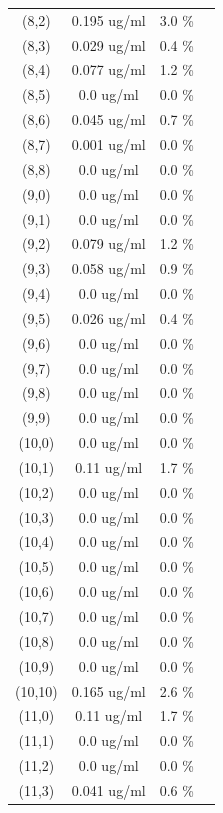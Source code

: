 \documentclass{article}
\begin{document}
\begin{tabular}{c c c c}
(8,2)&        0.195 ug/ml        &3.0 \%\\
(8,3)&        0.029 ug/ml        &0.4 \%\\
(8,4)&        0.077 ug/ml        &1.2 \%\\
(8,5)&        0.0 ug/ml        &0.0 \%\\
(8,6)&        0.045 ug/ml        &0.7 \%\\
(8,7)&        0.001 ug/ml        &0.0 \%\\
(8,8)&        0.0 ug/ml        &0.0 \%\\
(9,0)&        0.0 ug/ml        &0.0 \%\\
(9,1)&        0.0 ug/ml        &0.0 \%\\
(9,2)&        0.079 ug/ml        &1.2 \%\\
(9,3)&        0.058 ug/ml        &0.9 \%\\
(9,4)&        0.0 ug/ml        &0.0 \%\\
(9,5)&        0.026 ug/ml        &0.4 \%\\
(9,6)&        0.0 ug/ml        &0.0 \%\\
(9,7)&        0.0 ug/ml        &0.0 \%\\
(9,8)&        0.0 ug/ml        &0.0 \%\\
(9,9)&        0.0 ug/ml        &0.0 \%\\
(10,0)&        0.0 ug/ml        &0.0 \%\\
(10,1)&        0.11 ug/ml        &1.7 \%\\
(10,2)&        0.0 ug/ml        &0.0 \%\\
(10,3)&        0.0 ug/ml        &0.0 \%\\
(10,4)&        0.0 ug/ml        &0.0 \%\\
(10,5)&        0.0 ug/ml        &0.0 \%\\
(10,6)&        0.0 ug/ml        &0.0 \%\\
(10,7)&        0.0 ug/ml        &0.0 \%\\
(10,8)&        0.0 ug/ml        &0.0 \%\\
(10,9)&        0.0 ug/ml        &0.0 \%\\
(10,10)&        0.165 ug/ml        &2.6 \%\\
(11,0)&        0.11 ug/ml        &1.7 \%\\
(11,1)&        0.0 ug/ml        &0.0 \%\\
(11,2)&        0.0 ug/ml        &0.0 \%\\
(11,3)&        0.041 ug/ml        &0.6 \%\\

\end{tabular}
\end{document}

